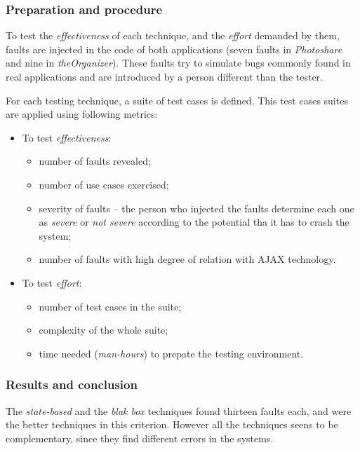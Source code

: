 \documentclass[a4paper]{article}
\begin{document}
\subsubsection{Preparation and procedure}

To test the \emph{effectiveness} of each technique, and the \emph{effort} demanded by them, faults are injected in the code of both applications (seven faults in \emph{Photoshare} and nine in \emph{theOrganizer}).
These faults try to simulate bugs commonly found in real applications and are introduced by a person different than the tester.

For each testing technique, a suite of test cases is defined.
This test cases suites are applied using following metrics:

\begin{itemize}

\item To test \emph{effectiveness}:
\begin{itemize}
\item number of faults revealed;
\item number of use cases exercised;
\item severity of faults -- the person who injected the faults determine each one as \emph{severe} or \emph{not severe} according to the potential tha it has to crash the system;
\item number of faults with high degree of relation with AJAX technology.
\end{itemize}

\item To test \emph{effort}:
\begin{itemize}
\item number of test cases in the suite;
\item complexity of the whole suite;
\item time needed (\emph{man-hours}) to prepate the testing environment.
\end{itemize}

\end{itemize} 

\subsubsection{Results and conclusion}

The \emph{state-based} and the \emph{blak box} techniques found thirteen faults each, and were the better techniques in this criterion.
However all the techniques seens to be complementary, since they find different errors in the systems.
\end{document}

